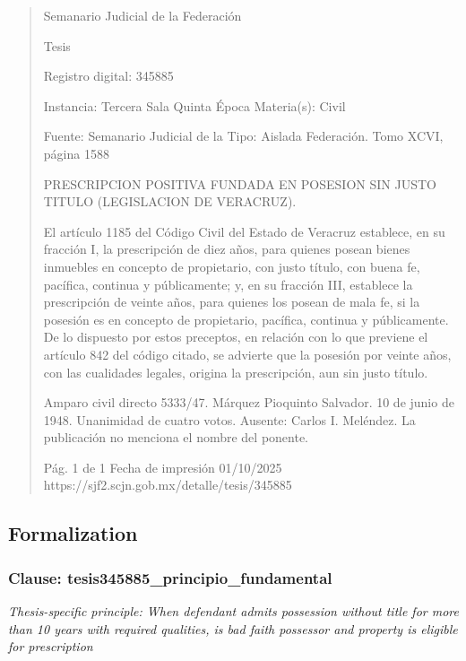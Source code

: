 \documentclass[11pt,a4paper]{article}
\begin{document}
\begin{quote}
                                                   Semanario Judicial de la Federación

                                                  Tesis

 Registro digital: 345885

 Instancia: Tercera Sala          Quinta Época                         Materia(s): Civil

                                  Fuente: Semanario Judicial de la     Tipo: Aislada
                                  Federación.
                                  Tomo XCVI, página 1588


PRESCRIPCION POSITIVA FUNDADA EN POSESION SIN JUSTO TITULO (LEGISLACION DE
VERACRUZ).


El artículo 1185 del Código Civil del Estado de Veracruz establece, en su fracción I, la prescripción
de diez años, para quienes posean bienes inmuebles en concepto de propietario, con justo título,
con buena fe, pacífica, continua y públicamente; y, en su fracción III, establece la prescripción de
veinte años, para quienes los posean de mala fe, si la posesión es en concepto de propietario,
pacífica, continua y públicamente. De lo dispuesto por estos preceptos, en relación con lo que
previene el artículo 842 del código citado, se advierte que la posesión por veinte años, con las
cualidades legales, origina la prescripción, aun sin justo título.


Amparo civil directo 5333/47. Márquez Pioquinto Salvador. 10 de junio de 1948. Unanimidad de
cuatro votos. Ausente: Carlos I. Meléndez. La publicación no menciona el nombre del ponente.




                                             Pág. 1 de 1             Fecha de impresión 01/10/2025
  https://sjf2.scjn.gob.mx/detalle/tesis/345885

\end{quote}

\subsection{Formalization}

\subsubsection{Clause: tesis345885\_principio\_fundamental}

\textit{Thesis-specific principle: When defendant admits possession without title for more than 10 years with required qualities, is bad faith possessor and property is eligible for prescription}
\end{document}
